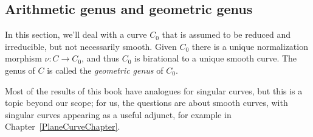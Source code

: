 %
%
%


\subsection{Arithmetic genus and geometric genus}
In this section, we'll deal with a  curve $C_0$ that is assumed to be reduced and irreducible, but not necessarily smooth.
Given $C_0$ there is a unique normalization morphism $\nu: C \to C_0$, and thus $C_0$ is birational to a unique
smooth curve. The genus of $C$ is called the \emph{geometric genus} of $C_0$.

Most of the results of this book have analogues for singular curves, but this is a topic beyond our scope; for us, the questions are about smooth curves, with singular curves appearing as a useful adjunct, for example in Chapter~\ref{PlaneCurveChapter}.

